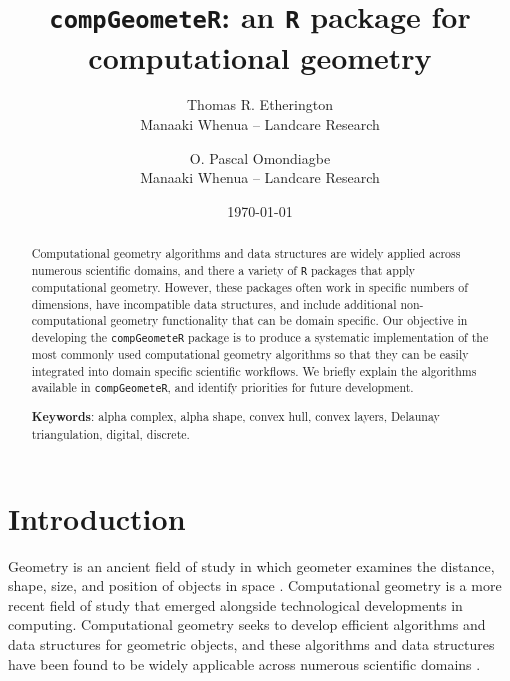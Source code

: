 \documentclass[12pt, a4paper]{article}
\begin{document}
\title{\texttt{compGeometeR}: an \texttt{R} package for computational geometry}

\author{Thomas R. Etherington  \\
	Manaaki Whenua -- Landcare Research  \\
	\and 
	O. Pascal Omondiagbe \\
	Manaaki Whenua -- Landcare Research \\
	}



\date{\today}



\maketitle


\begin{abstract}

Computational geometry algorithms and data structures are widely applied across numerous scientific domains, and there a variety of \texttt{R} packages that apply computational geometry.  However, these packages often work in specific numbers of dimensions, have incompatible data structures, and include additional non-computational geometry functionality that can be domain specific.  Our objective in developing the \texttt{compGeometeR} package is to produce a systematic implementation of the most commonly used computational geometry algorithms so that they can be easily integrated into domain specific scientific workflows.  We briefly explain the algorithms available in \texttt{compGeometeR}, and identify priorities for future development.

\begin{center}
\textbf{Keywords}: alpha complex, alpha shape, convex hull, convex layers, Delaunay triangulation, digital, discrete.
\end{center}

\end{abstract}

\section{Introduction}

Geometry is an ancient field of study in which geometer examines the distance, shape, size, and position of objects in space \citep{gowers-2003}.  Computational geometry is a more recent field of study that emerged alongside technological developments in computing.  Computational geometry seeks to develop efficient algorithms and data structures for geometric objects, and these algorithms and data structures have been found to be widely applicable across numerous scientific domains \citep{de-berg-2008}.
\end{document}
